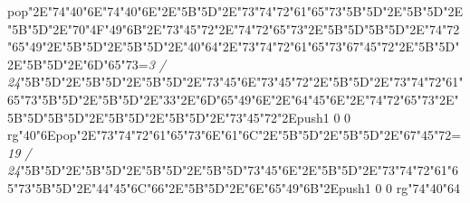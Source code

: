 pop{}\ipa\char"2E\ipa\char"74\ipa\char"40\ipa\char"6E\bigskip\ipa\char"74\ipa\char"40\ipa\char"6E\ipa\char"2E\ipa\char"5B\enskip\enskip\enskip\ipa\char"5D\ipa\char"2E\ipa\char"73\ipa\char"74\ipa\char"72\ipa\char"61\ipa\char"65\ipa\char"73\bigskip\ipa\char"5B\enskip\enskip\ipa\char"5D\ipa\char"2E\ipa\char"5B\enskip\enskip\enskip\enskip\ipa\char"5D\ipa\char"2E\ipa\char"5B\enskip\ipa\char"5D\ipa\char"2E\ipa\char"70\ipa\char"4F\ipa\char"49\ipa\char"6B\ipa\char"2E\ipa\char"73\ipa\char"45\ipa\char"72\ipa\char"2E\ipa\char"74\ipa\char"72\ipa\char"65\ipa\char"73\ipa\char"2E\ipa\char"5B\enskip\enskip\enskip\ipa\char"5D\bigskip\ipa\char"5B\enskip\ipa\char"5D\ipa\char"2E\ipa\char"74\ipa\char"72\ipa\char"65\ipa\char"49\ipa\char"2E\ipa\char"5B\enskip\enskip\ipa\char"5D\ipa\char"2E\ipa\char"5B\enskip\enskip\enskip\ipa\char"5D\ipa\char"2E\ipa\char"40\ipa\char"64\ipa\char"2E\ipa\char"73\ipa\char"74\ipa\char"72\ipa\char"61\ipa\char"65\ipa\char"73\bigskip\ipa\char"67\ipa\char"45\ipa\char"72\ipa\char"2E\ipa\char"5B\enskip\enskip\ipa\char"5D\ipa\char"2E\ipa\char"5B\enskip\enskip\enskip\ipa\char"5D\ipa\char"2E\ipa\char"6D\ipa\char"65\ipa\char"73\bigskip\vfill\footline={\hfill\tenrm\it 3 / 24}\eject\null\vfill\ipa\char"5B\enskip\enskip\enskip\ipa\char"5D\ipa\char"2E\ipa\char"5B\enskip\enskip\enskip\enskip\ipa\char"5D\ipa\char"2E\ipa\char"5B\enskip\ipa\char"5D\ipa\char"2E\ipa\char"73\ipa\char"45\ipa\char"6E\bigskip\ipa\char"73\ipa\char"45\ipa\char"72\ipa\char"2E\ipa\char"5B\enskip\enskip\enskip\ipa\char"5D\ipa\char"2E\ipa\char"73\ipa\char"74\ipa\char"72\ipa\char"61\ipa\char"65\ipa\char"73\bigskip\ipa\char"5B\enskip\enskip\ipa\char"5D\ipa\char"2E\ipa\char"5B\enskip\enskip\enskip\enskip\ipa\char"5D\ipa\char"2E\ipa\char"33\ipa\char"2E\ipa\char"6D\ipa\char"65\ipa\char"49\ipa\char"6E\ipa\char"2E\ipa\char"64\ipa\char"45\ipa\char"6E\ipa\char"2E\ipa\char"74\ipa\char"72\ipa\char"65\ipa\char"73\ipa\char"2E\ipa\char"5B\enskip\enskip\enskip\ipa\char"5D\bigskip\ipa\char"5B\enskip\ipa\char"5D\ipa\char"2E\ipa\char"5B\enskip\enskip\enskip\enskip\ipa\char"5D\ipa\char"2E\ipa\char"5B\enskip\enskip\ipa\char"5D\ipa\char"2E\ipa\char"73\ipa\char"45\ipa\char"72\ipa\char"2E\pdfcolorstack\match push{1 0 0 rg}\ipa\char"40\ipa\char"6E\pdfcolorstack\match pop{}\ipa\char"2E\ipa\char"73\ipa\char"74\ipa\char"72\ipa\char"61\ipa\char"65\ipa\char"73\bigskip\ipa\char"6E\ipa\char"61\ipa\char"6C\ipa\char"2E\ipa\char"5B\enskip\enskip\ipa\char"5D\ipa\char"2E\ipa\char"5B\enskip\enskip\enskip\ipa\char"5D\ipa\char"2E\ipa\char"67\ipa\char"45\ipa\char"72\bigskip\vfill\footline={\hfill\tenrm\it 19 / 24}\eject\null\vfill\ipa\char"5B\enskip\enskip\enskip\ipa\char"5D\ipa\char"2E\ipa\char"5B\enskip\enskip\enskip\enskip\ipa\char"5D\ipa\char"2E\ipa\char"5B\enskip\ipa\char"5D\ipa\char"2E\ipa\char"5B\enskip\enskip\enskip\ipa\char"5D\bigskip\ipa\char"73\ipa\char"45\ipa\char"6E\ipa\char"2E\ipa\char"5B\enskip\enskip\enskip\ipa\char"5D\ipa\char"2E\ipa\char"73\ipa\char"74\ipa\char"72\ipa\char"61\ipa\char"65\ipa\char"73\bigskip\ipa\char"5B\enskip\enskip\ipa\char"5D\ipa\char"2E\ipa\char"44\ipa\char"45\ipa\char"6C\ipa\char"66\ipa\char"2E\ipa\char"5B\enskip\ipa\char"5D\ipa\char"2E\ipa\char"6E\ipa\char"65\ipa\char"49\ipa\char"6B\ipa\char"2E\pdfcolorstack\match push{1 0 0 rg}\ipa\char"74\ipa\char"40\ipa\char"64\pdfcolorstack\match 